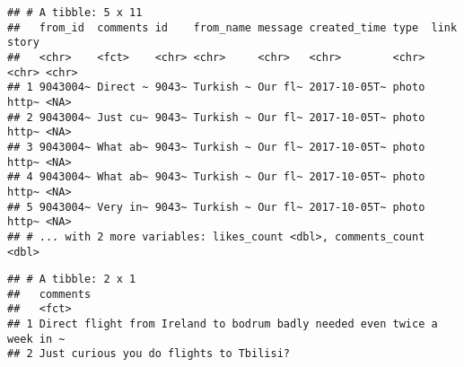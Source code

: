 \documentclass[]{article}
\newenvironment{Shaded}{\begin{snugshade}}{\end{snugshade}}
\newcommand{\KeywordTok}[1]{\textcolor[rgb]{0.13,0.29,0.53}{\textbf{#1}}}
\newcommand{\DataTypeTok}[1]{\textcolor[rgb]{0.13,0.29,0.53}{#1}}
\newcommand{\DecValTok}[1]{\textcolor[rgb]{0.00,0.00,0.81}{#1}}
\newcommand{\StringTok}[1]{\textcolor[rgb]{0.31,0.60,0.02}{#1}}
\newcommand{\OperatorTok}[1]{\textcolor[rgb]{0.81,0.36,0.00}{\textbf{#1}}}
\newcommand{\NormalTok}[1]{#1}
\begin{document}
\begin{Shaded}
\end{Shaded}

\begin{verbatim}
## # A tibble: 5 x 11
##   from_id  comments id    from_name message created_time type  link  story
##   <chr>    <fct>    <chr> <chr>     <chr>   <chr>        <chr> <chr> <chr>
## 1 9043004~ Direct ~ 9043~ Turkish ~ Our fl~ 2017-10-05T~ photo http~ <NA> 
## 2 9043004~ Just cu~ 9043~ Turkish ~ Our fl~ 2017-10-05T~ photo http~ <NA> 
## 3 9043004~ What ab~ 9043~ Turkish ~ Our fl~ 2017-10-05T~ photo http~ <NA> 
## 4 9043004~ What ab~ 9043~ Turkish ~ Our fl~ 2017-10-05T~ photo http~ <NA> 
## 5 9043004~ Very in~ 9043~ Turkish ~ Our fl~ 2017-10-05T~ photo http~ <NA> 
## # ... with 2 more variables: likes_count <dbl>, comments_count <dbl>
\end{verbatim}

\begin{Shaded}
\end{Shaded}

\begin{verbatim}
## # A tibble: 2 x 1
##   comments                                                                
##   <fct>                                                                   
## 1 Direct flight from Ireland to bodrum badly needed even twice a week in ~
## 2 Just curious you do flights to Tbilisi?
\end{verbatim}
\end{document}
